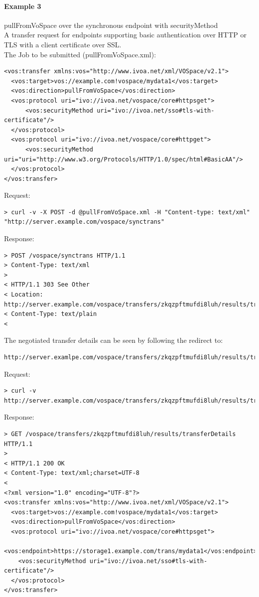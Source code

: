 \documentclass[11pt,a4paper]{ivoa}
\begin{document}
\paragraph{Example 3}
pullFromVoSpace over the synchronous endpoint with securityMethod
\\[5px]
\noindent
A transfer request for endpoints supporting basic authentication over HTTP or TLS with a client certificate over SSL.\\
The Job to be submitted (pullFromVoSpace.xml):
\begin{lstlisting}
<vos:transfer xmlns:vos="http://www.ivoa.net/xml/VOSpace/v2.1">
  <vos:target>vos://example.com!vospace/mydata1</vos:target>
  <vos:direction>pullFromVoSpace</vos:direction>
  <vos:protocol uri="ivo://ivoa.net/vospace/core#httpsget">
      <vos:securityMethod uri="ivo://ivoa.net/sso#tls-with-certificate"/>
  </vos:protocol>
  <vos:protocol uri="ivo://ivoa.net/vospace/core#httpget">
      <vos:securityMethod uri="uri="http://www.w3.org/Protocols/HTTP/1.0/spec/html#BasicAA"/>
  </vos:protocol>
</vos:transfer>
\end{lstlisting}
Request:
\begin{lstlisting}
> curl -v -X POST -d @pullFromVoSpace.xml -H "Content-type: text/xml" "http://server.example.com/vospace/synctrans"
\end{lstlisting}
Response:
\begin{lstlisting}
> POST /vospace/synctrans HTTP/1.1
> Content-Type: text/xml
>
< HTTP/1.1 303 See Other
< Location: http://server.example.com/vospace/transfers/zkqzpftmufdi8luh/results/transferDetails
< Content-Type: text/plain
<
\end{lstlisting}
The negotiated transfer details can be seen by following the redirect to:
\begin{lstlisting}
http://server.examlpe.com/vospace/transfers/zkqzpftmufdi8luh/results/transferDetails
\end{lstlisting}
Request:
\begin{lstlisting}
> curl -v http://server.example.com/vospace/transfers/zkqzpftmufdi8luh/results/transferDetails
\end{lstlisting}
Response:
\begin{lstlisting}
> GET /vospace/transfers/zkqzpftmufdi8luh/results/transferDetails HTTP/1.1
>
< HTTP/1.1 200 OK
< Content-Type: text/xml;charset=UTF-8
<
<?xml version="1.0" encoding="UTF-8"?>
<vos:transfer xmlns:vos="http://www.ivoa.net/xml/VOSpace/v2.1">
  <vos:target>vos://example.com!vospace/mydata1</vos:target>
  <vos:direction>pullFromVoSpace</vos:direction>
  <vos:protocol uri="ivo://ivoa.net/vospace/core#httpsget">
    <vos:endpoint>https://storage1.example.com/trans/mydata1</vos:endpoint>
    <vos:securityMethod uri="ivo://ivoa.net/sso#tls-with-certificate"/>
  </vos:protocol>
</vos:transfer>
\end{lstlisting}
\end{document}
